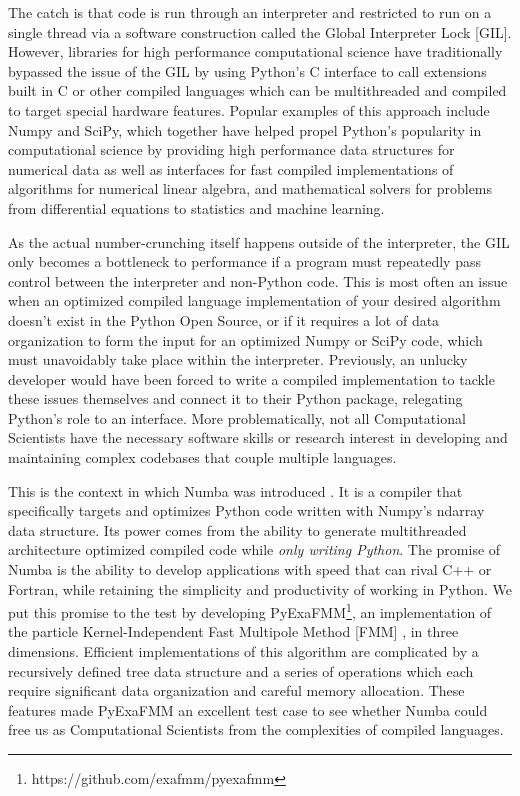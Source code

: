 \documentclass{IEEEcsmag}
\begin{document}
The catch is that code is run through an interpreter and restricted to run on a single thread via a software construction called the Global Interpreter Lock [GIL]. However, libraries for high performance computational science have traditionally bypassed the issue of the GIL by using Python's C interface to call extensions built in C or other compiled languages which can be multithreaded and compiled to target special hardware features. Popular examples of this approach include Numpy and SciPy, which together have helped propel Python's popularity in computational science by providing high performance data structures for numerical data as well as interfaces for fast compiled implementations of algorithms for numerical linear algebra, and mathematical solvers for problems from differential equations to statistics and machine learning.

As the actual number-crunching itself happens outside of the interpreter, the GIL only becomes a bottleneck to performance if a program must repeatedly pass control between the interpreter and non-Python code. This is most often an issue when an optimized compiled language implementation of your desired algorithm doesn't exist in the Python Open Source, or if it requires a lot of data organization to form the input for an optimized Numpy or SciPy code, which must unavoidably take place within the interpreter. Previously, an unlucky developer would have been forced to write a compiled implementation to tackle these issues themselves and connect it to their Python package, relegating Python's role to an interface. More problematically, not all Computational Scientists have the necessary software skills or research interest in developing and maintaining complex codebases that couple multiple languages.

This is the context in which Numba was introduced \cite{Lam2015}. It is a compiler that specifically targets and optimizes Python code written with Numpy's ndarray data structure. Its power comes from the ability to generate multithreaded architecture optimized compiled code while \textit{only writing Python}. The promise of Numba is the ability to develop applications with speed that can rival C++ or Fortran, while retaining the simplicity and productivity of working in Python. We put this promise to the test by developing PyExaFMM\footnote{https://github.com/exafmm/pyexafmm}, an implementation of the particle Kernel-Independent Fast Multipole Method [FMM] \cite{Ying2004}, in three dimensions. Efficient implementations of this algorithm are complicated by a recursively defined tree data structure and a series of operations which each require significant data organization and careful memory allocation. These features made PyExaFMM an excellent test case to see whether Numba could free us as Computational Scientists from the complexities of compiled languages.
\end{document}

